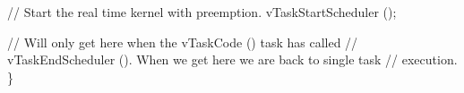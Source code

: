 \begin{DoxyPre}    // Start the real time kernel with preemption.
    vTaskStartScheduler ();\end{DoxyPre}



\begin{DoxyPre}    // Will only get here when the vTaskCode () task has called
    // vTaskEndScheduler ().  When we get here we are back to single task
    // execution.
\}
  \end{DoxyPre}
 